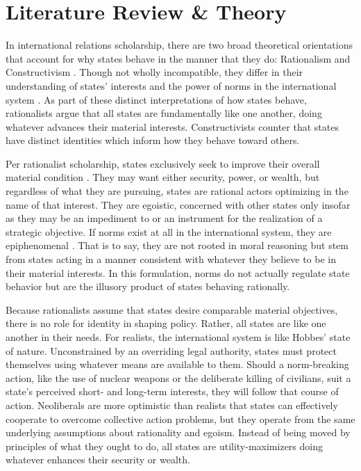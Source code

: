 \documentclass[12pt]{article}
\begin{document}
\section{Literature Review \& Theory}

In international relations scholarship, there are two broad theoretical orientations that account for why states behave in the manner that they do: Rationalism and Constructivism \citep{katzenstein_international_1998}. Though not wholly incompatible, they differ in their understanding of states' interests and the power of norms in the international system \citep{fearon_skeptical_2002}. As part of these distinct interpretations of how states behave, rationalists argue that all states are fundamentally like one another, doing whatever advances their material interests. Constructivists counter that states have distinct identities which inform how they behave toward others.

Per rationalist scholarship, states exclusively seek to improve their overall material condition \citep{waltz_man_1959, keohane_after_1984}. They may want either security, power, or wealth, but regardless of what they are pursuing, states are rational actors optimizing in the name of that interest. They are egoistic, concerned with other states only insofar as they may be an impediment to or an instrument for the realization of a strategic objective. If norms exist at all in the international system, they are epiphenomenal \citep{sagan_realist_2004}. That is to say, they are not rooted in moral reasoning but stem from states acting in a manner consistent with whatever they believe to be in their material interests. In this formulation, norms do not actually regulate state behavior but are the illusory product of states behaving rationally.

Because rationalists assume that states desire comparable material objectives, there is no role for identity in shaping policy. Rather, all states are like one another in their needs. For realists, the international system is like Hobbes' state of nature. Unconstrained by an overriding legal authority, states must protect themselves using whatever means are available to them. Should a norm-breaking action, like the use of nuclear weapons or the deliberate killing of civilians, suit a state's perceived short- and long-term interests, they will follow that course of action. Neoliberals are more optimistic than realists that states can effectively cooperate to overcome collective action problems, but they operate from the same underlying assumptions about rationality and egoism. Instead of being moved by principles of what they ought to do, all states are utility-maximizers doing whatever enhances their security or wealth.
\end{document}
